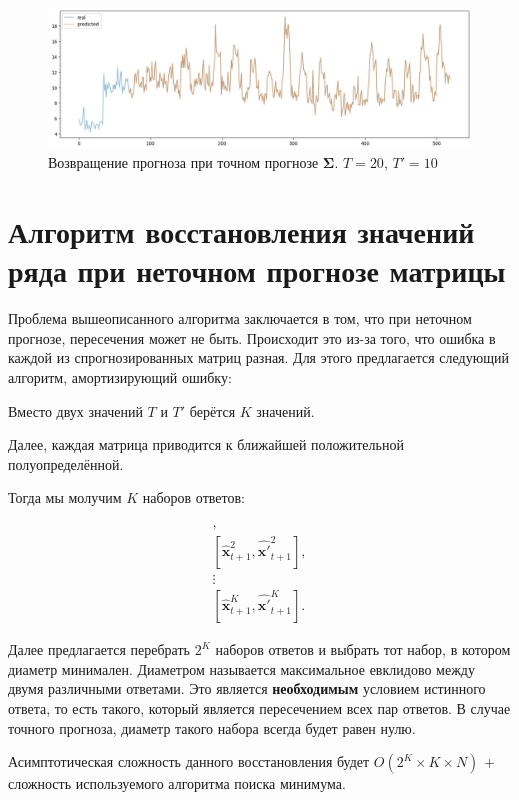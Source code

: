 \documentclass{article}
\begin{document}
\begin{figure}[H]
	\centering
	\includegraphics[width=\textwidth]{TwoTAlgo.jpg}
	\caption{Возвращение прогноза при точном прогнозе $\mathbf{\Sigma}$. $T=20$, $T'=10$}
	\label{fig:fig3}
\end{figure}

\section{Алгоритм восстановления значений ряда при неточном прогнозе матрицы}

Проблема вышеописанного алгоритма заключается в том, что при неточном прогнозе, пересечения может не быть. Происходит это из-за того, что ошибка в каждой из спрогнозированных матриц разная. Для этого предлагается следующий алгоритм, амортизирующий ошибку:

Вместо двух значений  $T$ и $T'$ берётся $K$ значений.

Далее, каждая матрица приводится к ближайшей положительной полуопределённой.

Тогда мы молучим $K$ наборов ответов:

\begin{gather*}
	[\hat{\mathbf{x}}_{t+1}^1, \hat{\mathbf{x}'}_{t+1}^1],\\
	[\hat{\mathbf{x}}_{t+1}^2, \hat{\mathbf{x}'}_{t+1}^2],\\
	\vdots \\
	[\hat{\mathbf{x}}_{t+1}^K, \hat{\mathbf{x}'}_{t+1}^K].
\end{gather*}

Далее предлагается перебрать $2^K$ наборов ответов и выбрать тот набор, в котором диаметр минимален. Диаметром называется максимальное евклидово между двумя различными ответами. Это является \textbf{необходимым} условием истинного ответа, то есть такого, который является пересечением всех пар ответов. В случае точного прогноза, диаметр такого набора всегда будет равен нулю.

Асимптотическая сложность данного восстановления будет $O(2^K \times K \times N)$ + сложность используемого алгоритма поиска минимума.
\end{document}
